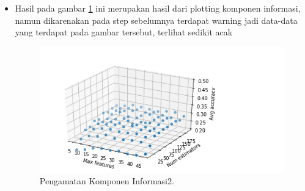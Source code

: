 \begin{enumerate}
\begin{itemize}
\item Hasil pada gambar \ref{comp2} ini merupakan hasil dari plotting komponen informasi, namun dikarenakan pada step sebelumnya terdapat warning jadi data-data yang terdapat pada gambar tersebut, terlihat sedikit acak
 		\begin{figure}[ht]
		\centerline{\includegraphics[width=1\textwidth]{figures/im/comp2.png}}
		\caption{Pengamatan Komponen Informasi2.}
		\label{comp2}
		\end{figure}
\end{itemize}
\end{enumerate}


